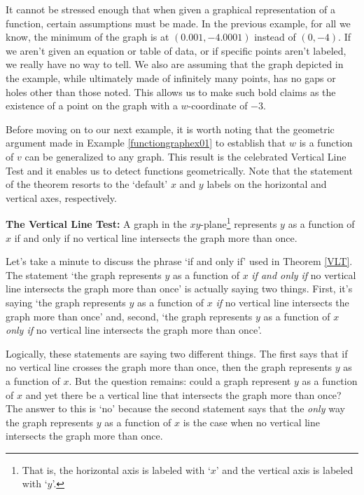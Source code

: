 It cannot be stressed enough that when given a graphical representation of a function, certain assumptions must be made.  In the previous example, for all we know, the minimum of the graph is at $(0.001, -4.0001)$ instead of $(0,-4)$.  If we aren't given an equation or table of data, or if specific points aren't labeled, we really have no way to tell.  We also are assuming that the graph depicted in the example, while ultimately made of infinitely many points, has no gaps or holes other than those noted.  This allows us to make such bold claims as the existence of a point on the graph with a $w$-coordinate of $-3$. 

\medskip

Before moving on to our next example, it is worth noting that the geometric argument made in Example  \ref{functiongraphex01} to establish that $w$ is a function of $v$  can be generalized to any graph.  This result is the celebrated Vertical Line Test and it enables us to detect functions geometrically.   Note that the statement of the theorem resorts to the `default' $x$ and $y$ labels on the horizontal and vertical axes, respectively.

\begin{tcolorbox}

\begin{thm}  \textbf{The Vertical Line Test:}   A graph in the $xy$-plane\footnote{That is, the horizontal axis is labeled with `$x$' and the vertical axis is labeled with `$y$'.}  represents $y$ as a function of $x$ if and only if no vertical line intersects the graph more than once.
\label{VLT}

\end{thm}

\end{tcolorbox}

Let's take a minute to discuss the phrase `if and only if' used in Theorem \ref{VLT}.   The statement `the graph represents $y$ as a function of $x$ \textit{if and only if} no vertical line intersects the graph more than once' is actually saying two things.  First, it's saying `the graph represents $y$ as a function of $x$  \textit{if} no vertical line intersects the graph more than once' and, second,  `the graph represents $y$ as a function of $x$  \textit{only if} no vertical line intersects the graph more than once'.   

Logically, these statements are saying two different things. The first says that if no vertical line crosses the graph more than once, then the graph represents $y$ as a function of $x$.  But the question remains:  could a graph represent $y$ as a function of $x$ and yet there be a vertical line that intersects the graph more than once?  The answer to this is `no' because the second statement says that the \textit{only} way the graph represents $y$ as a function of $x$ is the case when no vertical line intersects the graph more than once.

